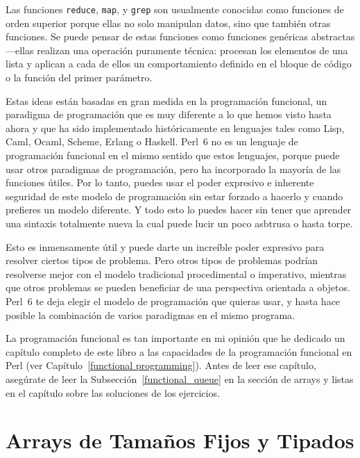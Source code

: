 
Las funciones {\tt reduce}, {\tt map}, y {\tt grep} son 
usualmente conocidas como funciones de orden superior porque
ellas no solo manipulan datos, sino que también otras funciones.
Se puede pensar de estas funciones como funciones 
genéricas abstractas---ellas realizan una operación puramente
técnica: procesan los elementos de una lista y aplican 
a cada de ellos un comportamiento definido en el bloque de
código o la función del primer parámetro.

Estas ideas están basadas en gran medida en la programación
funcional, un paradigma de programación que es muy diferente
a lo que hemos visto hasta ahora y que ha sido implementado
históricamente en lenguajes tales como Lisp, Caml, Ocaml,
Scheme, Erlang o Haskell. Perl~6 no es un lenguaje de 
programación funcional en el mismo sentido que estos lenguajes,
porque puede usar otros paradigmas de programación, pero 
ha incorporado la mayoría de las funciones útiles. Por lo tanto,
puedes usar el poder expresivo e inherente seguridad de este 
modelo de programación sin estar forzado a hacerlo y
cuando prefieres un modelo diferente. Y todo esto lo 
puedes hacer sin tener que aprender una sintaxis
totalmente nueva la cual puede lucir un poco asbtrusa 
o hasta torpe.

Esto es inmensamente útil y puede darte un increíble poder
expresivo para resolver ciertos tipos de problema.
Pero otros tipos de problemas podrían resolverse mejor
con el modelo tradicional procedimental o imperativo,
mientras que otros problemas se pueden beneficiar 
de una perspectiva orientada a objetos. Perl~6 te deja
elegir el modelo de programación que quieras usar, y hasta hace 
posible la combinación de varios paradigmas en el mismo
programa.

La programación funcional es tan importante en mi opinión
que he dedicado un capítulo completo de este libro a las
capacidades de la programación funcional en Perl 
(ver Capítulo~\ref{functional programming}). Antes de leer
ese capítulo, asegúrate de leer la Subsección~\ref{functional_queue}
en la sección de arrays y listas en el capítulo sobre las
soluciones de los ejercicios.

\section{Arrays de Tamaños Fijos y Tipados}

